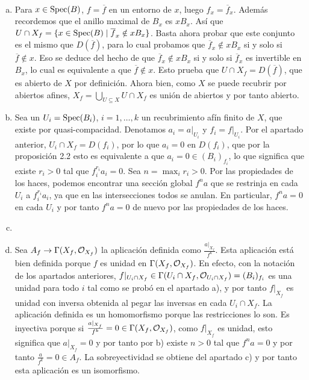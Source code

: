 \documentclass[twoside]{article}
\begin{document}
\begin{solucion}\
\begin{enumerate}[(a)]
\item Para $x\in\operatorname{Spec}(B)$, $f=\overline{f}$ en un entorno de $x$, luego $f_x=\overline{f}_x$. Además recordemos que el anillo maximal de $B_x$ es $xB_x$. Así que $U\cap X_f=\{x\in\operatorname{Spec}(B)\mid\overline{f}_x\notin xB_x\}$. Basta ahora probar que este conjunto es el mismo que $D(\overline{f})$, para lo cual probamos que $\overline{f}_x\notin xB_x$ si y solo si $\overline{f}\notin x$. Eso se deduce del hecho de que $\overline{f}_x\notin xB_x$ si y solo si $\overline{f}_x$ es invertible en $B_x$, lo cual es equivalente a que $\overline{f}\notin x$. Esto prueba que $U\cap X_f=D(\overline{f})$, que es abierto de $X$ por definición. Ahora bien, como $X$ se puede recubrir por abiertos afines, $X_f=\bigcup_{U\subseteq X} U\cap X_f$ es unión de abiertos y por tanto abierto. 
\item Sea un $U_i=\operatorname{Spec}(B_i)$, $i=1,\dots, k$ un recubrimiento afín finito de $X$, que existe por quasi-compacidad. Denotamos $a_i=a|_{U_i}$ y $f_i=f|_{U_i}$. Por el apartado anterior, $U_i\cap X_f=D(f_i)$, por lo que $a_i=0$ en $D(f_i)$, que por la proposición 2.2 esto es equivalente a que $a_i=0\in (B_i)_{f_i}$, lo que significa que existe $r_i>0$ tal que $f_i^{r_i}a_i=0$. Sea $n=\max_i r_i>0$. Por las propiedades de los haces, podemos encontrar una sección global $f^na$ que se restrinja en cada $U_i$ a $f_i^{r_i}a_i$, ya que en las intersecciones todos se anulan. En particular, $f^na=0$ en cada $U_i$ y por tanto $f^na=0$ de nuevo por las propiedades de los haces. 
\item
\item Sea $A_f\to\Gamma(X_f,{\mathcal O}_{X_f})$ la aplicación definida como $\frac{a|_{X_f}}{f^k}$. Esta aplicación está bien definida porque $f$ es unidad en $\Gamma(X_f,{\mathcal O}_{X_f})$. En efecto, con la notación de los apartados anteriores, $f|_{U_i\cap X_f}\in \Gamma(U_i\cap X_f,{\mathcal O}_{U_i\cap X_f})=(B_i)_{f_i}$ es una unidad para todo $i$ tal como se probó en el apartado a), y por tanto $f|_{X_f}$ es unidad con inversa obtenida al pegar las inversas en cada $U_i\cap X_f$. La aplicación definida es un homomorfismo porque las restricciones lo son. Es inyectiva porque si $\frac{a|_{X_f}}{f^k}=0\in \Gamma(X_f,{\mathcal O}_{X_f})$, como $f|_{X_f}$ es unidad, esto significa que $a|_{X_f}=0$ y por tanto por b) existe $n>0$ tal que $f^na=0$ y por tanto $\frac{a}{f^k}=0\in A_f$. La sobreyectividad se obtiene del apartado c) y por tanto esta aplicación es un isomorfismo.
\end{enumerate}

\end{solucion}
\end{document}
